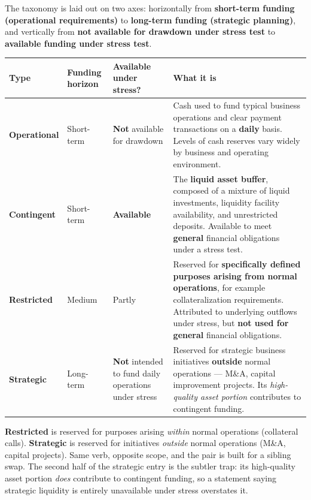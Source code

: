 The taxonomy is laid out on two axes: horizontally from \textbf{short-term funding (operational requirements)} to \textbf{long-term funding (strategic planning)}, and vertically from \textbf{not available for drawdown under stress test} to \textbf{available funding under stress test}.

\begin{center}
\small
\begin{tabularx}{\textwidth}{@{}p{2.3cm} p{2.5cm} p{2.6cm} X@{}}
\toprule
\rowcolor{FRMSoft}\textbf{Type} & \textbf{Funding horizon} & \textbf{Available under stress?} & \textbf{What it is} \\
\midrule
\textbf{Operational} & Short-term & \textbf{Not} available for drawdown &
Cash used to fund typical business operations and clear payment transactions on a \textbf{daily} basis. Levels of cash reserves vary widely by business and operating environment. \\
\addlinespace
\textbf{Contingent} & Short-term & \textbf{Available} &
The \textbf{liquid asset buffer}, composed of a mixture of liquid investments, liquidity facility availability, and unrestricted deposits. Available to meet \textbf{general} financial obligations under a stress test. \\
\addlinespace
\textbf{Restricted} & Medium & Partly &
Reserved for \textbf{specifically defined purposes arising from normal operations}, for example collateralization requirements. Attributed to underlying outflows under stress, but \textbf{not used for general} financial obligations. \\
\addlinespace
\textbf{Strategic} & Long-term & \textbf{Not} intended to fund daily operations under stress &
Reserved for strategic business initiatives \textbf{outside} normal operations --- M\&A, capital improvement projects. Its \emph{high-quality asset portion} contributes to contingent funding. \\
\bottomrule
\end{tabularx}
\end{center}

\begin{lrtrapbox}
\textbf{Restricted} is reserved for purposes arising \emph{within} normal operations (collateral calls). \textbf{Strategic} is reserved for initiatives \emph{outside} normal operations (M\&A, capital projects). Same verb, opposite scope, and the pair is built for a sibling swap. The second half of the strategic entry is the subtler trap: its high-quality asset portion \emph{does} contribute to contingent funding, so a statement saying strategic liquidity is entirely unavailable under stress overstates it.
\end{lrtrapbox}

